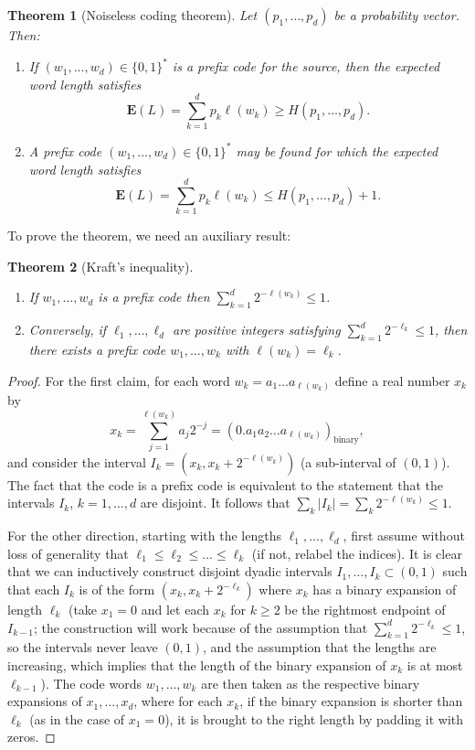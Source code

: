 \documentclass[12pt]{article}
\newtheorem{thm}{Theorem}[section]
\newcommand{\expec}{\mathbf{E}}
\theoremstyle{example}
\begin{document}
\begin{thm}[Noiseless coding theorem] Let $(p_1,\ldots,p_d)$ be a probability vector. Then:
\begin{enumerate}
\item If $(w_1,\ldots,w_d) \in \{0,1\}^* $ is a prefix code for the source, then the expected word length satisfies
$$ \expec(L) = \sum_{k=1}^d p_k \ell(w_k) \ge H(p_1,\ldots, p_d). $$
\item A prefix code $(w_1,\ldots,w_d) \in \{0,1\}^* $ may be found for which the expected word length satisfies
$$ \expec(L) = \sum_{k=1}^d p_k \ell(w_k) \le H(p_1,\ldots, p_d) + 1. $$
\end{enumerate}
\end{thm}

To prove the theorem, we need an auxiliary result:

\begin{thm}[Kraft's inequality] \ \\ \vspace{-20.0pt}
\begin{enumerate}
\item If $w_1,\ldots,w_d$ is a prefix code then $\sum_{k=1}^d 2^{-\ell(w_k)} \le 1$. 
\item Conversely, if $\ell_1,\ldots,\ell_d$ are positive integers satisfying $\sum_{k=1}^d 2^{-\ell_k} \le 1$, then there exists a prefix code $w_1,\ldots,w_k$ with $\ell(w_k)=\ell_k$.
\end{enumerate}
\end{thm}

\begin{proof}
For the first claim, for each word $w_k=a_1\ldots a_{\ell(w_k)}$ define a real number $x_k$ by
$$ x_k = \sum_{j=1}^{\ell(w_k)} a_j 2^{-j} = (0.a_1a_2\ldots a_{\ell(w_k)})_{\textrm{binary}}, $$
and consider the interval $I_k = (x_k,x_k+2^{-\ell(w_k)})$ (a sub-interval of $(0,1)$). The fact that the code is a prefix code is equivalent to the statement that the intervals $I_k$, $k=1,\ldots,d$ are disjoint. It follows that $\sum_k |I_k| = \sum_k 2^{-\ell(w_k)} \le 1$.

For the other direction, starting with the lengths $\ell_1,\ldots,\ell_d$, first assume without loss of generality that $\ell_1\le \ell_2\le \ldots \le \ell_k$ (if not, relabel the indices). It is clear that we can inductively construct disjoint dyadic intervals $I_1,\ldots,I_k \subset (0,1)$ such that each $I_k$ is of the form $(x_k,x_k+2^{-\ell_k})$ where $x_k$ has a binary expansion of length $\ell_k$ (take $x_1=0$ and let each $x_k$ for $k\ge 2$ be the rightmost endpoint of $I_{k-1}$; the construction will work because of the assumption that $\sum_{k=1}^d 2^{-\ell_k} \le 1$, so the intervals never leave $(0,1)$, and the assumption that the lengths are increasing, which implies that the length of the binary expansion of $x_k$ is at most $\ell_{k-1}$). The code words $w_1,\ldots,w_k$ are then taken as the respective binary expansions of $x_1,\ldots,x_d$, where for each $x_k$, if the binary expansion is shorter than $\ell_k$ (as in the case of $x_1=0$), it is brought to the right length by padding it with zeros.
\end{proof}
\end{document}
